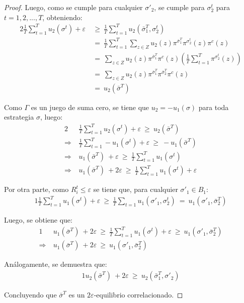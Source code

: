 \begin{proof}
Luego, como se cumple para cualquier $\sigma'_2$, se cumple para $\sigma_2^t$ para $t = 1, 2, ..., T$, obteniendo:
\begin{alignat}{2}
\frac{1}{T} \sum_{t = 1}^T u_2(\sigma^t) + \varepsilon\ & \geq\ \frac{1}{T} \sum_{t = 1}^T u_2(\bar{\sigma}_1^T, \sigma_2^t) \\
&=\ \frac{1}{T} \sum_{t = 1}^T \sum_{z \in Z} u_2(z) \pi^{\bar{\sigma}_1^T}\pi^{\sigma_2^t}(z) \pi^c(z) \\
&=\  \sum_{z \in Z} u_2(z) \pi^{\bar{\sigma}_1^T} \pi^c(z) \left( \frac{1}{T} \sum_{t = 1}^T \pi^{\sigma_2^t}(z) \right)\\
&=\  \sum_{z \in Z} u_2(z) \pi^{\bar{\sigma}_1^T} \pi^{\bar{\sigma}_2^T} \pi^c(z) \\
&=\ u_2(\bar{\sigma}^T)
\end{alignat}

Como $\Gamma$ es un juego de suma cero, se tiene que $u_2 = -u_1(\sigma)$ para toda estrategia $\sigma$, luego:
\begin{alignat}{2}
	& \frac{1}{T} \sum_{t = 1}^T u_2(\sigma^t) + \varepsilon\ \geq\  u_2(\bar{\sigma}^T) \\
	\Rightarrow\ & \frac{1}{T} \sum_{t = 1}^T -u_1(\sigma^t) + \varepsilon\ \geq\  -u_1(\bar{\sigma}^T) \\
	\Rightarrow\ &  u_1(\bar{\sigma}^T)\ + \varepsilon\ \geq\   \frac{1}{T} \sum_{t = 1}^T u_1(\sigma^t)  \\
	\Rightarrow\ &  u_1(\bar{\sigma}^T)\ + 2\varepsilon\ \geq\   \frac{1}{T} \sum_{t = 1}^T u_1(\sigma^t) + \varepsilon
\end{alignat}

Por otra parte, como $R_i^t \leq \varepsilon$ se tiene que, para cualquier $\sigma'_1 \in B_1$:
\begin{alignat}{1}
	\frac{1}{T} \sum_{t = 1}^T u_1(\sigma^t) + \varepsilon\ \geq\ \frac{1}{T} \sum_{t = 1} u_1(\sigma'_1, \sigma_2^t)\ =\ u_1(\sigma'_1, \bar{\sigma}_2^T)
\end{alignat}

Luego, se obtiene que:
\begin{alignat}{1}
	& u_1(\bar{\sigma}^T)\ + 2\varepsilon\ \geq\   \frac{1}{T} \sum_{t = 1}^T u_1(\sigma^t) + \varepsilon\ \geq\ u_1(\sigma'_1, \bar{\sigma}_2^T)\\
	\Rightarrow\ & u_1(\bar{\sigma}^T)\ + 2\varepsilon\ \geq\ u_1(\sigma'_1, \bar{\sigma}_2^T)
\end{alignat}

Análogamente, se demuestra que:
\begin{alignat}{1}
	u_2(\bar{\sigma}^T)\ + 2\varepsilon\ \geq\ u_2( \bar{\sigma}_1^T, \sigma'_2)
\end{alignat}

Concluyendo que $\bar{\sigma}^T$ es un $2\varepsilon$-equilibrio correlacionado.
\end{proof}

